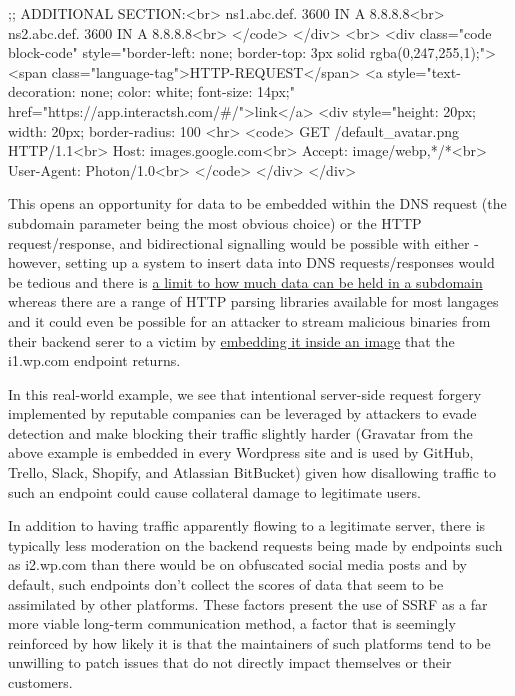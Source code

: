 \begin{rawhtml}
                    ;; ADDITIONAL SECTION:<br>
                    ns1.abc.def.	3600	IN	A	8.8.8.8<br>
                    ns2.abc.def.	3600	IN	A	8.8.8.8<br>
                </code>
            </div>
        <br>
        <div class="code block-code" style="border-left: none; border-top: 3px solid rgba(0,247,255,1);">
                <span class="language-tag">HTTP-REQUEST</span>
                <a style="text-decoration: none; color: white; font-size: 14px;" href="https://app.interactsh.com/#/">link</a>
                <div style="height: 20px; width: 20px; border-radius: 100%
                <hr>
                <code>
                    GET /default_avatar.png HTTP/1.1<br>
                    Host: images.google.com<br>
                    Accept: image/webp,*/*<br>
                    User-Agent: Photon/1.0<br>
                </code>
            </div>
        </div>
\end{rawhtml}

This opens an opportunity for data to be embedded within the DNS request (the subdomain parameter being the most obvious choice) or the HTTP request/response,
            and bidirectional signalling would be possible with either - however, setting up a system to insert data into DNS requests/responses would be tedious and there
            is \href{https://www.rfc-editor.org/rfc/rfc1034#section-3.1}{a limit to how much data can be held in a subdomain} whereas there are a range of HTTP
            parsing libraries available for most langages and it could even be possible for an attacker to stream malicious binaries from their backend serer to a victim
            by \href{https://djharper.dev/post/2020/12/26/executable-pngs/}{embedding it inside an image} that the i1.wp.com
            endpoint returns.

In this real-world example, we see that intentional server-side request forgery implemented by reputable companies can be
            leveraged by attackers to evade detection and make blocking their traffic slightly harder (Gravatar from the above example is embedded in every Wordpress site
            and is used by GitHub, Trello, Slack, Shopify, and Atlassian BitBucket) given how disallowing traffic to such an endpoint could cause collateral damage to
            legitimate users.

In addition to having traffic apparently flowing to a legitimate server, there is typically less moderation on the backend requests being made by endpoints such as
            i2.wp.com than there would be on obfuscated social media posts and by default, such endpoints don't collect the scores of data that seem to be
            assimilated by other platforms. These factors present the use of SSRF as a far more viable long-term communication method, a factor that is
            seemingly reinforced by how likely it is that the maintainers of such platforms tend to be unwilling to patch issues that do not directly impact
            themselves or their customers.

